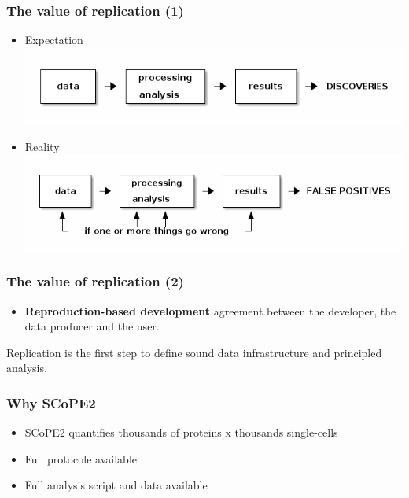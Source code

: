 \documentclass{beamer}
\newcommand{\frametitlesection}[1]{\frametitle{\centering #1 \footnotesize \hspace{0pt plus 1 filll} \insertsection}}
\begin{document}
\begin{frame}
  \frametitlesection{The value of replication (1)}

  \begin{itemize}
  \item<+-> Expectation
    \includegraphics[width=\linewidth]{figs/expectation.png}
  \item<+-> Reality
    \includegraphics[width=\linewidth]{figs/reality.png}
  \end{itemize}
  
\end{frame}

\begin{frame}
  \frametitlesection{The value of replication (2)}

  \begin{itemize}
  \item \textbf{Reproduction-based development} agreement between the
    developer, the data producer and the user.
  \end{itemize}


  \bigskip
  
  Replication is the first step to define sound data infrastructure
  and principled analysis.
  
\end{frame}

\begin{frame}
  \frametitlesection{Why SCoPE2}
    \begin{itemize}
        \item{SCoPE2 quantifies thousands of proteins x thousands single-cells}
        \item{Full protocole available}
        \item{Full analysis script and data available}
    \end{itemize}


\end{frame}
\end{document}
